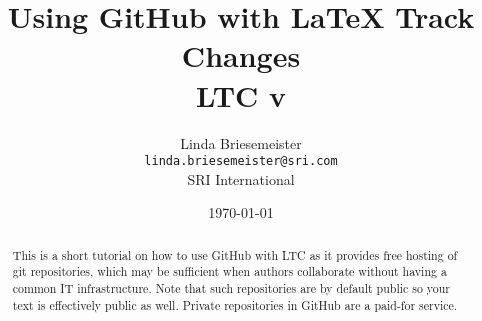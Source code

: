 \documentclass{article}
\title{Using GitHub\textsuperscript{\textcopyright} with \LaTeX{} Track Changes \\ {\large LTC v\version}}
\author{%
Linda Briesemeister\\
\texttt{linda.briesemeister@sri.com}\\
SRI International
}
\date{\today}
\begin{document}
\maketitle

\begin{abstract}
This is a short tutorial on how to use GitHub with LTC as it provides free hosting of git repositories, which may be sufficient when authors collaborate without having a common IT infrastructure.  Note that such repositories are by default public so your text is effectively public as well.  Private repositories in GitHub are a paid-for service.
\end{abstract}

\tableofcontents

\thispagestyle{fancy}
\pagestyle{fancy}



%
%
%
\end{document}
